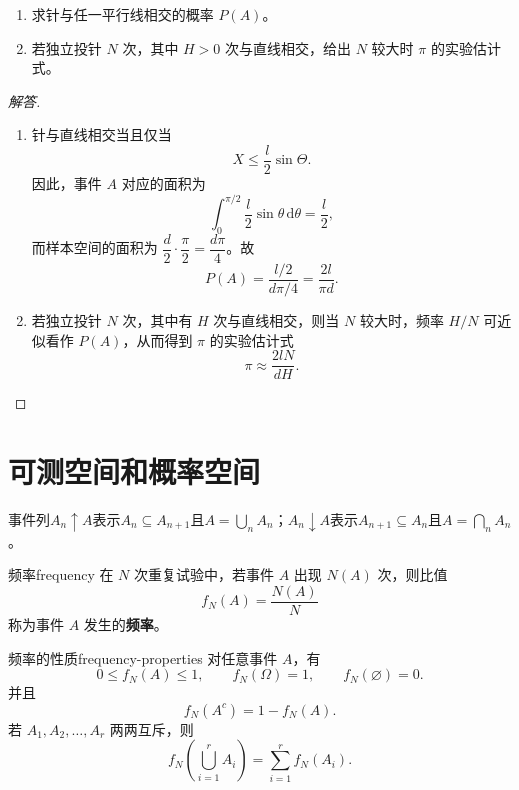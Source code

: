 \begin{enumerate}
\item 求针与任一平行线相交的概率 $P(A)$。
\item 若独立投针 $N$ 次，其中 $H>0$ 次与直线相交，给出 $N$ 较大时 $\pi$ 的实验估计式。
\end{enumerate}

\begin{proof}[解答]
\begin{enumerate}
\item 针与直线相交当且仅当
\[
X\leq \dfrac l2\sin\Theta.
\]
因此，事件 $A$ 对应的面积为
\[
\int_0^{\pi/2}\dfrac l2\sin\theta\,\mathrm{d}\theta
=\dfrac l2,
\]
而样本空间的面积为 $\dfrac d2\cdot\dfrac{\pi}{2}=\dfrac{d\pi}{4}$。故
\[
P(A)=\dfrac{l/2}{d\pi/4}=\dfrac{2l}{\pi d}.
\]
\item 若独立投针 $N$ 次，其中有 $H$ 次与直线相交，则当 $N$ 较大时，频率 $H/N$ 可近似看作 $P(A)$，从而得到 $\pi$ 的实验估计式
\[
\pi\approx\dfrac{2lN}{dH}.
\]
\end{enumerate}
\end{proof}

\clearpage\section{可测空间和概率空间}\label{k:probability}
事件列$A_n\uparrow A$表示$A_n\subseteq A_{n+1}$且$A=\bigcup_nA_n$；$A_n\downarrow A$表示$A_{n+1}\subseteq A_n$且$A=\bigcap_nA_n$。

\begin{mydefinition}{频率}{frequency}
在 $N$ 次重复试验中，若事件 $A$ 出现 $N(A)$ 次，则比值
\[
f_N(A)=\dfrac{N(A)}{N}
\]
称为事件 $A$ 发生的\textbf{频率}。
\end{mydefinition}

\begin{proposition}{频率的性质}{frequency-properties}
对任意事件 $A$，有
\[
0\leq f_N(A)\leq1,
\qquad
f_N(\Omega)=1,
\qquad
f_N(\varnothing)=0.
\]
并且
\[
f_N(A^c)=1-f_N(A).
\]
若 $A_1,A_2,\ldots,A_r$ 两两互斥，则
\[
f_N\left(\bigcup_{i=1}^{r}A_i\right)
=\sum_{i=1}^{r}f_N(A_i).
\]
\end{proposition}

